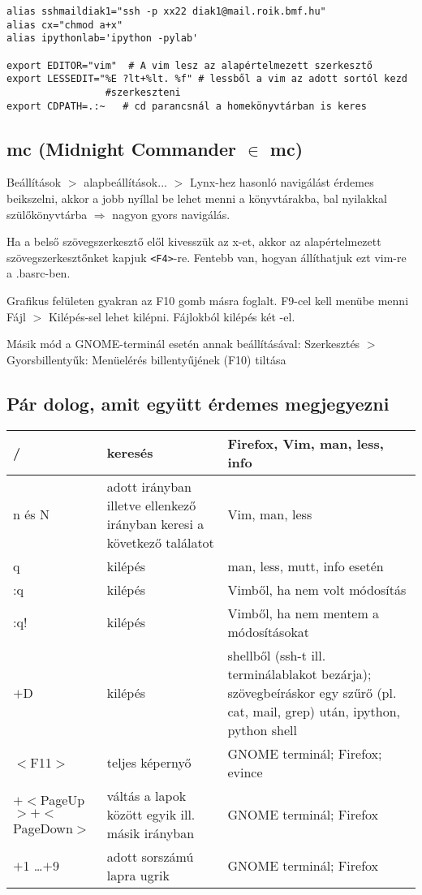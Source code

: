 \documentclass[a4paper]{article}
\newcommand{\Esc}{\framebox{\texttt{Esc}}}
\newcommand{\Ctrl}{\framebox{\texttt{Ctrl}}}
\newcommand{\Alt}{\framebox{\texttt{Alt}}}
\begin{document}
\hspace{1 ex}
\begin{Verbatim}[label=\fbox{~/.bashrc}, frame=single]
alias sshmaildiak1="ssh -p xx22 diak1@mail.roik.bmf.hu"
alias cx="chmod a+x"
alias ipythonlab='ipython -pylab'

export EDITOR="vim"  # A vim lesz az alapértelmezett szerkesztő
export LESSEDIT="%E ?lt+%lt. %f" # lessből a vim az adott sortól kezd
				 #szerkeszteni
export CDPATH=.:~   # cd parancsnál a homekönyvtárban is keres
\end{Verbatim}

\subsection{mc (Midnight Commander $\in$ mc)}

Beállítások $>$ alapbeállítások... $>$ Lynx-hez hasonló navigálást
érdemes beikszelni, akkor a jobb nyíllal be lehet menni a
könyvtárakba, bal nyilakkal szülőkönyvtárba $\Rightarrow$ nagyon gyors
navigálás.

Ha a belső szövegszerkesztő elől kivesszük az x-et, akkor az
alapértelmezett szövegszerkesztőnket kapjuk \verb+<F4>+-re. Fentebb van,
hogyan állíthatjuk ezt vim-re a .basrc-ben.

Grafikus felületen gyakran az F10 gomb másra foglalt. F9-cel kell
menübe menni Fájl $>$ Kilépés-sel lehet kilépni. Fájlokból kilépés két
\Esc-el.

Másik mód a GNOME-terminál esetén annak beállításával: Szerkesztés $>$
Gyorsbillentyűk: Menüelérés billentyűjének (F10) tiltása

\subsection{Pár dolog, amit együtt érdemes megjegyezni}

\noindent
\begin{tabularx}{\textwidth}{|l|X|X|}
\hline
/ & keresés &Firefox, Vim, man, less, info\\
\hline
n és N& adott irányban illetve ellenkező irányban keresi a következő
találatot&Vim, man, less\\
\hline
q& kilépés& man, less, mutt, info esetén\\
\hline
:q& kilépés& Vimből, ha nem volt módosítás\\
\hline
:q!& kilépés& Vimből, ha nem mentem a  módosításokat\\
\hline
\Ctrl$+$D& kilépés& shellből (ssh-t ill. terminálablakot bezárja); szövegbeíráskor  egy
szűrő (pl. cat, mail, grep) után, ipython, python shell\\
\hline
$<$F11$>$& teljes képernyő& GNOME terminál; Firefox; evince\\
\hline
\Ctrl$+<$PageUp$>$\quad \Ctrl$+<$PageDown$>$& váltás a lapok között
egyik ill. másik irányban&
GNOME terminál; Firefox\\
\hline
\Alt$+$1 \dots \Alt$+$9& adott sorszámú lapra ugrik& GNOME terminál; Firefox\\
\hline
\end{tabularx}
\end{document}
